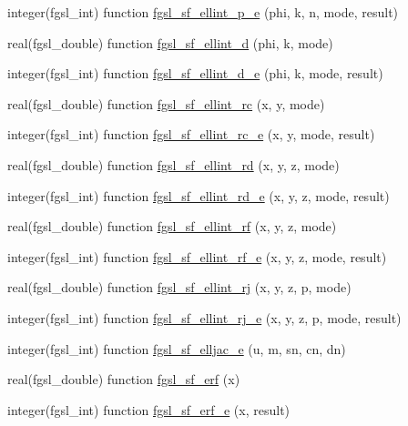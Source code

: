 \begin{DoxyCompactItemize}
\item 
integer(fgsl\+\_\+int) function \hyperlink{specfunc_8finc_ab23078451803edd7689b0e3ec28b4dff}{fgsl\+\_\+sf\+\_\+ellint\+\_\+p\+\_\+e} (phi, k, n, mode, result)
\item 
real(fgsl\+\_\+double) function \hyperlink{specfunc_8finc_ab6725988ed3b1dd682f6425c823b630a}{fgsl\+\_\+sf\+\_\+ellint\+\_\+d} (phi, k, mode)
\item 
integer(fgsl\+\_\+int) function \hyperlink{specfunc_8finc_a3d4a0de6eb4eae5dc245fda00f22dbd6}{fgsl\+\_\+sf\+\_\+ellint\+\_\+d\+\_\+e} (phi, k, mode, result)
\item 
real(fgsl\+\_\+double) function \hyperlink{specfunc_8finc_a1d5f3ce316b48bf6ffb8982ca5057082}{fgsl\+\_\+sf\+\_\+ellint\+\_\+rc} (x, y, mode)
\item 
integer(fgsl\+\_\+int) function \hyperlink{specfunc_8finc_a719664cd13b3a41176c83a57444bc4f5}{fgsl\+\_\+sf\+\_\+ellint\+\_\+rc\+\_\+e} (x, y, mode, result)
\item 
real(fgsl\+\_\+double) function \hyperlink{specfunc_8finc_a96ae786ccf6f90310994e69eee97b77c}{fgsl\+\_\+sf\+\_\+ellint\+\_\+rd} (x, y, z, mode)
\item 
integer(fgsl\+\_\+int) function \hyperlink{specfunc_8finc_a8084cb09e7e835c687eb9c2a5cad7ca3}{fgsl\+\_\+sf\+\_\+ellint\+\_\+rd\+\_\+e} (x, y, z, mode, result)
\item 
real(fgsl\+\_\+double) function \hyperlink{specfunc_8finc_aa707e789919facfc58a92e5a08ca2de2}{fgsl\+\_\+sf\+\_\+ellint\+\_\+rf} (x, y, z, mode)
\item 
integer(fgsl\+\_\+int) function \hyperlink{specfunc_8finc_a5e71262e6008d0136c89240b94fc7380}{fgsl\+\_\+sf\+\_\+ellint\+\_\+rf\+\_\+e} (x, y, z, mode, result)
\item 
real(fgsl\+\_\+double) function \hyperlink{specfunc_8finc_a7fc2447a6251348ae8b394cfae4e08f5}{fgsl\+\_\+sf\+\_\+ellint\+\_\+rj} (x, y, z, p, mode)
\item 
integer(fgsl\+\_\+int) function \hyperlink{specfunc_8finc_a1937bf929872bcfaf8486f0e5b2886fc}{fgsl\+\_\+sf\+\_\+ellint\+\_\+rj\+\_\+e} (x, y, z, p, mode, result)
\item 
integer(fgsl\+\_\+int) function \hyperlink{specfunc_8finc_a380d6346bd860573f6536a7e4879b650}{fgsl\+\_\+sf\+\_\+elljac\+\_\+e} (u, m, sn, cn, dn)
\item 
real(fgsl\+\_\+double) function \hyperlink{specfunc_8finc_ac6186ec7c1d34190b0b934c8081e04e4}{fgsl\+\_\+sf\+\_\+erf} (x)
\item 
integer(fgsl\+\_\+int) function \hyperlink{specfunc_8finc_ab802f6d2fa1b4c7397098ee78eb00ae8}{fgsl\+\_\+sf\+\_\+erf\+\_\+e} (x, result)

\end{DoxyCompactItemize}
